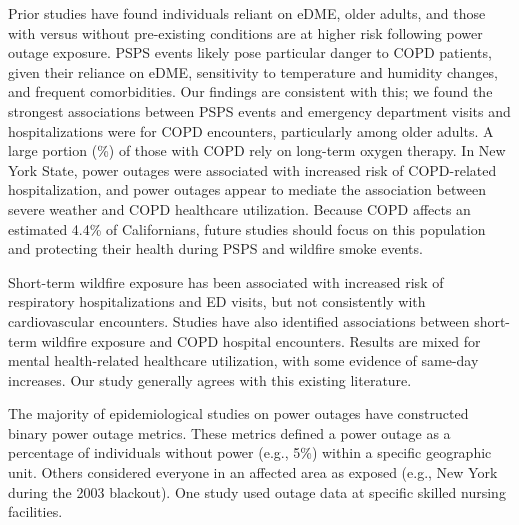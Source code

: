 \documentclass[../main.tex]{subfiles}
\begin{document}
Prior studies have found individuals reliant on eDME, older adults, and those with versus without pre-existing conditions are at higher risk following power outage exposure.\citep{molinari2017s, harding2025a, sheridan2021individual, deng2022independent, xu2025power, casey2020power} PSPS events likely pose particular danger to COPD patients, given their reliance on eDME, sensitivity to temperature and humidity changes, and frequent comorbidities.\citep{casey2020power} Our findings are consistent with this; we found the strongest associations between PSPS events and emergency department visits and hospitalizations were for COPD encounters, particularly among older adults. A large portion (\%) of those with COPD rely on long-term oxygen therapy.\citep{hess2023oxygen, nishi2015oxygen} In New York State, power outages were associated with increased risk of COPD-related hospitalization, and power outages appear to mediate the association between severe weather and COPD healthcare utilization.\citep{zhang2020power, qu2021power} Because COPD affects an estimated 4.4\% of Californians,\citep{cdc2024copd} future studies should focus on this population and protecting their health during PSPS and wildfire smoke events.

Short-term wildfire \PM exposure has been associated with increased risk of respiratory hospitalizations and ED visits, but not consistently with cardiovascular encounters.\citep{gould2024health} Studies have also identified associations between short-term wildfire \PM exposure and COPD hospital encounters.\citep{sutherland2005wildfire, reid2019wildfire, wilgus2024clearing, wang2025differential} Results are mixed for mental health-related healthcare utilization, with some evidence of same-day increases.\citep{wettstein2024psychotropic, jung2025fine, chen2023emergency} Our study generally agrees with this existing literature. 

The majority of epidemiological studies on power outages have constructed binary power outage metrics. These metrics defined a power outage as a percentage of individuals without power (e.g., 5\%) within a specific geographic unit.\citep{northrop2024power, do2025impact, lin2021immediate, lin2024joint, zhang2020power, deng2022independent} Others considered everyone in an affected area as exposed (e.g., New York during the 2003 blackout).\citep{anderson2011impacts, dominianni2018health} One study used outage data at specific skilled nursing facilities.\citep{skarha2021association} 
\end{document}
